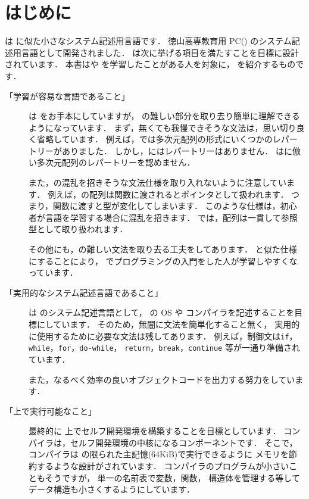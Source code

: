 % 
%
\chapter{はじめに}

\cmml は \cl に似た小さなシステム記述用言語です．
徳山高専教育用 PC(\tac) のシステム記述用言語として開発されました．
\cmml は次に挙げる項目を満たすことを目標に設計されています．
本書は\cl や \javal を学習したことがある人を対象に，
\cmml を紹介するものです．

\begin{description}
\item[「学習が容易な言語であること」]
\cmml は \cl をお手本にしていますが，
\cl の難しい部分を取り去り簡単に理解できるようになっています．
まず，無くても我慢できそうな文法は，思い切り良く省略しています．
例えば，\cl では多次元配列の形式にいくつかのレパートリーがありました．
しかし，\javal にはレパートリーはありません．
\cmml は\javal に倣い多次元配列のレパートリーを認めません．

また，\cl の混乱を招きそうな文法仕様を取り入れないように注意しています．
例えば，\cl の配列は関数に渡されるとポインタとして扱われます．
つまり，関数に渡すと型が変化してしまいます．
このような仕様は，初心者が言語を学習する場合に混乱を招きます．
\cmml では，配列は一貫して参照型として取り扱われます．

その他にも，\cl の難しい文法を取り去る工夫をしてあります．
\javal と似た仕様にすることにより，
\javal でプログラミングの入門をした人が学習しやすくなっています．

\item[「実用的なシステム記述言語であること」]
\cmml は \tac のシステム記述言語として，
\tac の OS や \cmm コンパイラを記述することを目標にしています．
そのため，無闇に文法を簡単化すること無く，
実用的に使用するために必要な文法は残してあります．
例えば，制御文は{\tt if}，{\tt while}，{\tt for}，{\tt do-while}，
{\tt return}，{\tt break}，{\tt continue} 等が一通り準備されています．

また，なるべく効率の良いオブジェクトコードを出力する努力をしています．

\item[「\tac 上で実行可能なこと」]
最終的に \tac 上でセルフ開発環境を構築することを目標としています．
\cmm コンパイラは，セルフ開発環境の中核になるコンポーネントです．
そこで，\cmm コンパイラは \tac の限られた主記憶(64KiB)で実行できるように
メモリを節約するような設計がされています．
コンパイラのプログラムが小さいこともそうですが，
単一の名前表で変数，関数，
構造体を管理する等してデータ構造も小さくするようにしています．


\end{description}
